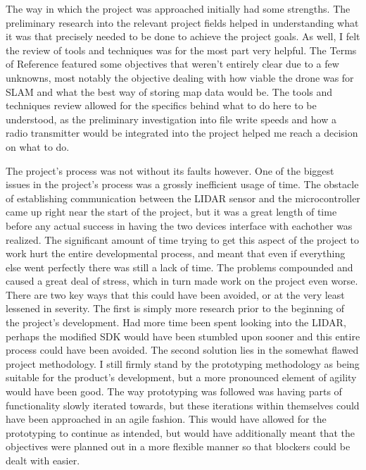 	The way in which the project was approached initially had some strengths. The preliminary research into the relevant project fields helped in understanding what it was that precisely needed to be done to achieve the project goals. As well, I felt the review of tools and techniques was for the most part very helpful. The Terms of Reference featured some objectives that weren't entirely clear due to a few unknowns, most notably the objective dealing with how viable the drone was for SLAM and what the best way of storing map data would be. The tools and techniques review allowed for the specifics behind what to do here to be understood, as the preliminary investigation into file write speeds and how a radio transmitter would be integrated into the project helped me reach a decision on what to do.
	
	The project's process was not without its faults however. One of the biggest issues in the project's process was a grossly inefficient usage of time. The obstacle of establishing communication between the LIDAR sensor and the microcontroller came up right near the start of the project, but it was a great length of time before any actual success in having the two devices interface with eachother was realized. The significant amount of time trying to get this aspect of the project to work hurt the entire developmental process, and meant that even if everything else went perfectly there was still a lack of time. The problems compounded and caused a great deal of stress, which in turn made work on the project even worse. There are two key ways that this could have been avoided, or at the very least lessened in severity. The first is simply more research prior to the beginning of the project's development. Had more time been spent looking into the LIDAR, perhaps the modified SDK would have been stumbled upon sooner and this entire process could have been avoided. The second solution lies in the somewhat flawed project methodology. I still firmly stand by the prototyping methodology as being suitable for the product's development, but a more pronounced element of agility would have been good. The way prototyping was followed was having parts of functionality slowly iterated towards, but these iterations within themselves could have been approached in an agile fashion. This would have allowed for the prototyping to continue as intended, but would have additionally meant that the objectives were planned out in a more flexible manner so that blockers could be dealt with easier.
	

